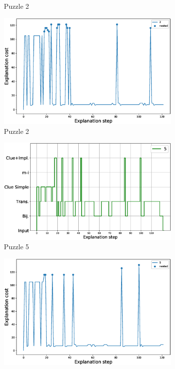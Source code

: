 \begin{figure}
\begin{subfigure}{.5\textwidth}
		\caption{Puzzle 2}
		\label{fig:composition_puzzle:p2}
	\end{subfigure}%
	\begin{subfigure}{.5\textwidth}
		\centering
		\includegraphics[width=0.84\linewidth]{figures/2.eps}
		\caption{Puzzle 2}
		\label{fig:cost_puzzle:p2}
	\end{subfigure}
	\begin{subfigure}{.5\textwidth}
		\centering
		\includegraphics[width=0.9\linewidth]{figures/plot_cost_steps_5.eps}
		\caption{Puzzle 5}
		\label{fig:composition_puzzle:p5}
	\end{subfigure}%
	\begin{subfigure}{.5\textwidth}
		\centering
		\includegraphics[width=0.84\linewidth]{figures/5.eps}

\end{subfigure}
\end{figure}
